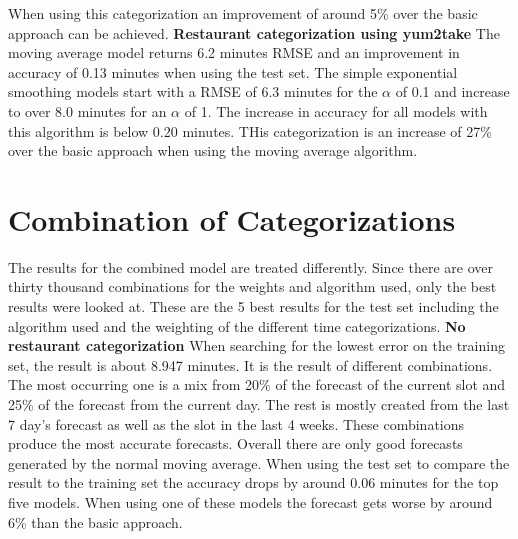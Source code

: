 When using this categorization an improvement of around 5\% over the basic approach can be achieved.
\newline\newline\textbf{Restaurant categorization using yum2take}\newline
The moving average model returns 6.2 minutes RMSE and an improvement in accuracy of 0.13 minutes when using the test set. The simple exponential smoothing models start with a RMSE of 6.3 minutes for the $\alpha$ of 0.1 and increase to over 8.0 minutes for an $\alpha$ of 1. The increase in accuracy for all models with this algorithm is below 0.20 minutes.\newline
THis categorization is an increase of 27\% over the basic approach when using the moving average algorithm.
\section{Combination of Categorizations}\label{section:Combination of Categorizations}
The results for the combined model are treated differently. Since there are over thirty thousand combinations for the weights and algorithm used, only the best results were looked at. These are the 5 best results for the test set including the algorithm used and the weighting of the different time categorizations.
\newline\newline\textbf{No restaurant categorization}\newline
When searching for the lowest error on the training set, the result is about 8.947 minutes. It is the result of different combinations. The most occurring one is a mix from 20\% of the forecast of the current slot and 25\% of the forecast from the current day. The rest is mostly created from the last 7 day’s forecast as well as the slot in the last 4 weeks. These combinations produce the most accurate forecasts. Overall there are only good forecasts generated by the normal moving average. When using the test set to compare the result to the training set the accuracy drops by around 0.06 minutes for the top five models.\newline
When using one of these models the forecast gets worse by around 6\% than the basic approach.
